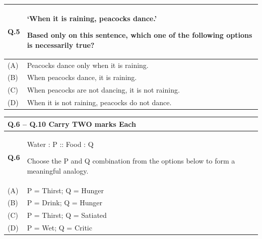 \documentclass[14pt]{article}
\begin{document}
\vspace{0.5cm}

\begin{tabular}{|p{1.5cm}|p{12cm}|}
\hline

\textbf{Q.5} &
`When it is raining, peacocks dance.'

Based only on this sentence, which one of the following options is necessarily true?
\\

\hline
(A) & Peacocks dance only when it is raining. \\
\hline
(B) & When peacocks dance, it is raining. \\
\hline
(C) & When peacocks are not dancing, it is not raining. \\
\hline
(D) & When it is not raining, peacocks do not dance. \\
\hline

\end{tabular}
\newpage

\begin{tabular}{|p{1.5cm}|p{12cm}|}
\hline

\multicolumn{2}{|l|}{\textbf{Q.6 -- Q.10 Carry TWO marks Each}} \\
\hline

\textbf{Q.6} &
Water : P :: Food : Q

Choose the P and Q combination from the options below to form a meaningful analogy.
\\

\hline
(A) & P = Thirst; Q = Hunger \\
\hline
(B) & P = Drink; Q = Hunger \\
\hline
(C) & P = Thirst; Q = Satiated \\
\hline
(D) & P = Wet; Q = Critic \\
\hline

\end{tabular}

\vspace{0.7cm}
\end{document}
